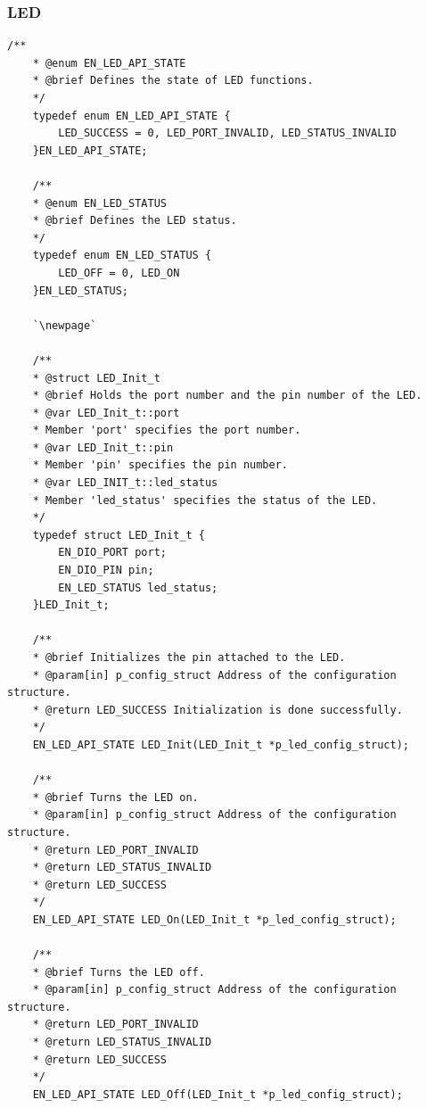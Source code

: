 \documentclass[10pt]{article}
\begin{document}
\subsubsection{LED}
\begin{lstlisting}[style=CStyle,escapeinside=``]
	/**
	* @enum EN_LED_API_STATE
	* @brief Defines the state of LED functions.
	*/
	typedef enum EN_LED_API_STATE {
		LED_SUCCESS = 0, LED_PORT_INVALID, LED_STATUS_INVALID
	}EN_LED_API_STATE;
	
	/**
	* @enum EN_LED_STATUS
	* @brief Defines the LED status.
	*/
	typedef enum EN_LED_STATUS {
		LED_OFF = 0, LED_ON
	}EN_LED_STATUS;
	
	`\newpage`
	
	/**
	* @struct LED_Init_t
	* @brief Holds the port number and the pin number of the LED.
	* @var LED_Init_t::port
	* Member 'port' specifies the port number.
	* @var LED_Init_t::pin
	* Member 'pin' specifies the pin number.
	* @var LED_INIT_t::led_status
	* Member 'led_status' specifies the status of the LED.
	*/
	typedef struct LED_Init_t {
		EN_DIO_PORT port;
		EN_DIO_PIN pin;
		EN_LED_STATUS led_status;
	}LED_Init_t;
	
	/**
	* @brief Initializes the pin attached to the LED.
	* @param[in] p_config_struct Address of the configuration structure.
	* @return LED_SUCCESS Initialization is done successfully.
	*/
	EN_LED_API_STATE LED_Init(LED_Init_t *p_led_config_struct);
	
	/**
	* @brief Turns the LED on.
	* @param[in] p_config_struct Address of the configuration structure.
	* @return LED_PORT_INVALID
	* @return LED_STATUS_INVALID
	* @return LED_SUCCESS
	*/
	EN_LED_API_STATE LED_On(LED_Init_t *p_led_config_struct);
	
	/**
	* @brief Turns the LED off.
	* @param[in] p_config_struct Address of the configuration structure.
	* @return LED_PORT_INVALID
	* @return LED_STATUS_INVALID
	* @return LED_SUCCESS
	*/
	EN_LED_API_STATE LED_Off(LED_Init_t *p_led_config_struct);
\end{lstlisting}
\end{document}
